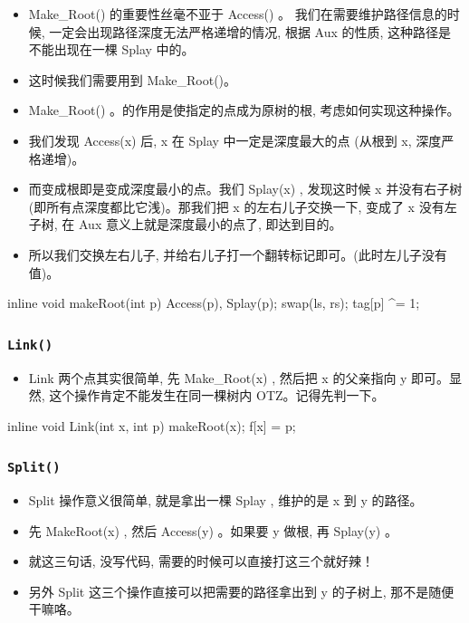\begin{itemize}
\item Make\_Root() 的重要性丝毫不亚于 Access() 。 我们在需要维护路径信息的时候, 一定会出现路径深度无法严格递增的情况, 根据 Aux 的性质, 这种路径是不能出现在一棵 Splay 中的。
\item 这时候我们需要用到 Make\_Root()。
\item Make\_Root() 。的作用是使指定的点成为原树的根, 考虑如何实现这种操作。
\item 我们发现 Access(x) 后,  x 在 Splay 中一定是深度最大的点 (从根到 x, 深度严格递增)。
\item 而变成根即是变成深度最小的点。我们 Splay(x) , 发现这时候 x 并没有右子树 (即所有点深度都比它浅)。那我们把 x 的左右儿子交换一下, 变成了 x 没有左子树, 在 Aux 意义上就是深度最小的点了, 即达到目的。
\item 所以我们交换左右儿子, 并给右儿子打一个翻转标记即可。(此时左儿子没有值)。
\end{itemize}

\begin{cppcode}
inline void makeRoot(int p) {
  Access(p), Splay(p);
  swap(ls, rs);
  tag[p] ^= 1;
}
\end{cppcode}

\subsubsection{\texttt{Link()}}

\begin{itemize}
\item Link 两个点其实很简单,  先 Make\_Root(x) , 然后把 x 的父亲指向 y 即可。显然, 这个操作肯定不能发生在同一棵树内 OTZ。记得先判一下。
\end{itemize}

\begin{cppcode}
inline void Link(int x, int p) {
  makeRoot(x);
  f[x] = p;
}
\end{cppcode}

\subsubsection{\texttt{Split()}}

\begin{itemize}
\item Split 操作意义很简单, 就是拿出一棵 Splay , 维护的是 x 到 y 的路径。
\item 先 MakeRoot(x) , 然后 Access(y) 。如果要 y 做根, 再 Splay(y) 。
\item 就这三句话, 没写代码, 需要的时候可以直接打这三个就好辣！
\item 另外 Split 这三个操作直接可以把需要的路径拿出到 y 的子树上, 那不是随便干嘛咯。
\end{itemize}

